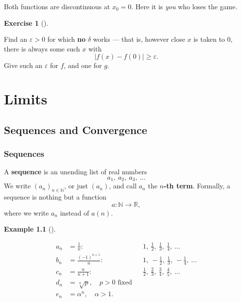 \documentclass[
  letterpaper,
  DIV=11,
  numbers=noendperiod]{scrreprt}
\theoremstyle{plain}
\theoremstyle{plain}
\theoremstyle{definition}
\theoremstyle{definition}
\newtheorem{exercise}{Exercise}[chapter]
\theoremstyle{definition}
\newtheorem{example}{Example}[chapter]
\theoremstyle{plain}
\theoremstyle{plain}
\theoremstyle{remark}
\begin{document}
Both functions are discontinuous at \(x_0 = 0\). Here it is \emph{you}
who loses the game.

\begin{exercise}[]\protect\hypertarget{exr-activity-discontinuous}{}\label{exr-activity-discontinuous}

Find an \(\varepsilon > 0\) for which \textbf{no} \(\delta\) works ---
that is, however close \(x\) is taken to \(0\), there is always some
such \(x\) with \[
\lvert f(x) - f(0) \rvert \ge \varepsilon.
\] Give such an \(\varepsilon\) for \(f\), and one for \(g\).

\end{exercise}

\part{Limits}

\chapter{Sequences and Convergence}\label{sequences-and-convergence}

\section{Sequences}\label{sequences}

A \textbf{sequence} is an unending list of real numbers \[
a_1,\ a_2,\ a_3,\ \ldots
\] We write \((a_n)_{n\in\mathbb{N}}\), or just \((a_n)\), and call
\(a_n\) the \textbf{\(n\)-th term}. Formally, a sequence is nothing but
a function \[
a\colon \mathbb{N}\to \mathbb{R},
\] where we write \(a_n\) instead of \(a(n)\).

\begin{example}[]\protect\hypertarget{exm-sequences}{}\label{exm-sequences}

\hfill\break
\[
\begin{aligned}
a_n &= \tfrac{1}{n}: & &1,\ \tfrac12,\ \tfrac13,\ \tfrac14,\ \ldots \\[2pt]
b_n &= \tfrac{(-1)^{n+1}}{n}: & &1,\ -\tfrac12,\ \tfrac13,\ -\tfrac14,\ \ldots \\[2pt]
c_n &= \tfrac{n}{n+1}: & &\tfrac12,\ \tfrac23,\ \tfrac34,\ \tfrac45,\ \ldots \\[2pt]
d_n &= \sqrt[n]{p}, \quad p>0 \text{ fixed} \\[2pt]
e_n &= \alpha^n, \quad \alpha>1.
\end{aligned}
\]

\end{example}
\end{document}
